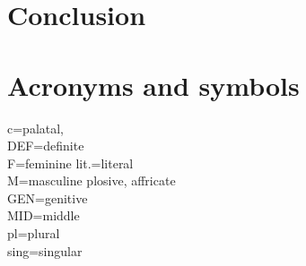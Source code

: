 \documentclass[11pt,a4paper]{article}
\begin{document}
	
	\section{Conclusion}
	
	\newpage
	
	
	
	\newpage
	\section*{Acronyms and symbols}
	c=palatal,\\
	DEF=definite\\
	F=feminine
	lit.=literal\\
	M=masculine
	plosive, affricate\\
	GEN=genitive\\
	MID=middle\\
	pl=plural\\
	sing=singular\\
	
\end{document}
